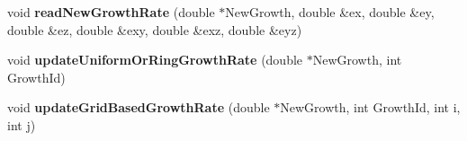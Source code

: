 \begin{DoxyCompactItemize}
\item 
\hypertarget{classShapeBase_a8f1565bbfd6c6a1452d95d910b4f7d9e}{}void {\bfseries read\+New\+Growth\+Rate} (double $\ast$New\+Growth, double \&ex, double \&ey, double \&ez, double \&exy, double \&exz, double \&eyz)\label{classShapeBase_a8f1565bbfd6c6a1452d95d910b4f7d9e}

\item 
\hypertarget{classShapeBase_a62f7b57ae77a98a009ba2c5cd520fa71}{}void {\bfseries update\+Uniform\+Or\+Ring\+Growth\+Rate} (double $\ast$New\+Growth, int Growth\+Id)\label{classShapeBase_a62f7b57ae77a98a009ba2c5cd520fa71}

\item 
\hypertarget{classShapeBase_aff32f6cd08aba5c167297852b72e40b0}{}void {\bfseries update\+Grid\+Based\+Growth\+Rate} (double $\ast$New\+Growth, int Growth\+Id, int i, int j)\label{classShapeBase_aff32f6cd08aba5c167297852b72e40b0}

\end{DoxyCompactItemize}
